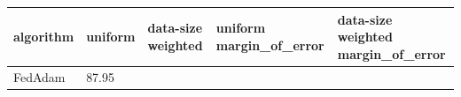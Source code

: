 \begin{tabular}{lllll}
\toprule
algorithm & uniform & data-size weighted & uniform margin_of_error & data-size weighted margin_of_error \\
\midrule
FedAdam & 87.95%
\bottomrule
\end{tabular}
